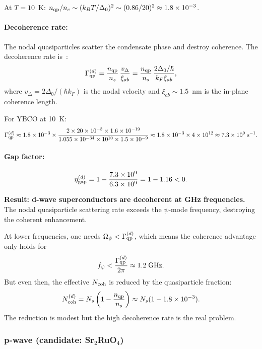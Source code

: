 \documentclass[12pt,aps,prd,twocolumn,superscriptaddress,nofootinbib]{revtex4-2}
\newcommand{\ee}[1]{\times 10^{#1}}
\begin{document}
At $T = 10$~K: $n_{\rm qp}/n_e \sim (k_BT/\Delta_0)^2
\sim (0.86/20)^2 \approx 1.8\ee{-3}$.

\paragraph{Decoherence rate:}
The nodal quasiparticles scatter the condensate phase and destroy
coherence. The decoherence rate is~\cite{Hirschfeld1993}:
\begin{equation}\label{eq:Gamma-qp-dwave}
\Gamma_{\rm qp}^{(d)} = \frac{n_{\rm qp}}{n_s}\,
\frac{v_\Delta}{\xi_{ab}}
= \frac{n_{\rm qp}}{n_s}\,\frac{2\Delta_0/\hbar}{k_F\xi_{ab}},
\end{equation}
where $v_\Delta = 2\Delta_0/(\hbar k_F)$ is the nodal velocity
and $\xi_{ab} \sim 1.5$~nm is the in-plane coherence length.

For YBCO at 10~K:
\begin{equation}
\Gamma_{\rm qp}^{(d)} \approx 1.8\ee{-3}\times\frac{2\times20\ee{-3}
\times1.6\ee{-19}}{1.055\ee{-34}\times10^{10}\times1.5\ee{-9}}
\approx 1.8\ee{-3}\times4\ee{12} \approx 7.3\ee{9}\;\si{s^{-1}}.
\end{equation}

\paragraph{Gap factor:}
\begin{equation}
\eta_{\rm gap}^{(d)} = 1 - \frac{7.3\ee{9}}{6.3\ee{9}}
= 1 - 1.16 < 0.
\end{equation}

\textbf{Result: d-wave superconductors are decoherent at GHz
frequencies.} The nodal quasiparticle scattering rate exceeds the
$\psi$-mode frequency, destroying the coherent enhancement.

At lower frequencies, one needs $\Omega_\psi < \Gamma_{\rm qp}^{(d)}$,
which means the coherence advantage only holds for
\begin{equation}
f_\psi < \frac{\Gamma_{\rm qp}^{(d)}}{2\pi} \approx 1.2\;\text{GHz}.
\end{equation}
But even then, the effective $N_{\rm coh}$ is reduced by the
quasiparticle fraction:
\begin{equation}
N_{\rm coh}^{(d)} = N_s\left(1 - \frac{n_{\rm qp}}{n_s}\right)
\approx N_s(1 - 1.8\ee{-3}).
\end{equation}
The reduction is modest but the high decoherence rate is the real problem.

\subsubsection{p-wave (candidate: Sr$_2$RuO$_4$)}
\end{document}
